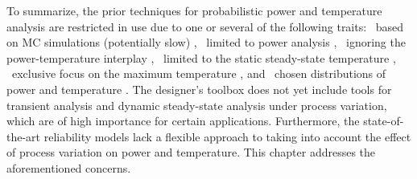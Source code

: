 To summarize, the prior techniques for probabilistic power and temperature
analysis are restricted in use due to one or several of the following traits:
\one~based on \ac{MC} simulations (potentially slow) \cite{chandra2010},
\two~limited to power analysis \cite{bhardwaj2006, ghanta2006, vrudhula2006,
bhardwaj2008, shen2009, chandra2010}, \three~ignoring the power-temperature
interplay \cite{bhardwaj2006, ghanta2006, vrudhula2006, bhardwaj2008,
huang2009a, shen2009}, \four~limited to the static steady-state temperature
\cite{huang2009a, juan2011, juan2012, lee2013}, \five~exclusive focus on the
maximum temperature \cite{juan2011}, and \six~\apriori chosen distributions of
power and temperature \cite{bhardwaj2006, srivastava2010, juan2012}. The
designer's toolbox does not yet include tools for transient analysis and dynamic
steady-state analysis under process variation, which are of high importance for
certain applications. Furthermore, the state-of-the-art reliability models lack
a flexible approach to taking into account the effect of process variation on
power and temperature. This chapter addresses the aforementioned concerns.
